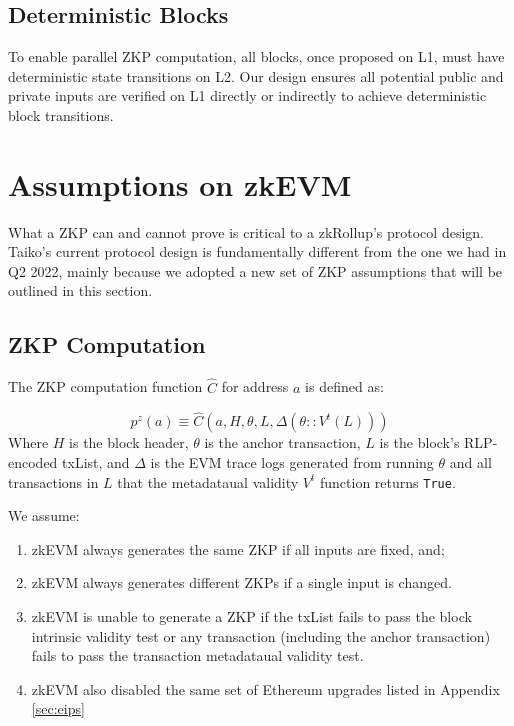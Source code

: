 \documentclass[9pt,oneside]{amsart}
\begin{document}
\begin{multicols}{2}
\subsection{Deterministic Blocks}
To enable parallel ZKP computation, all blocks, once proposed on L1, must have deterministic state transitions on L2. Our design ensures all potential public and private inputs are verified on L1 directly or indirectly to achieve deterministic block transitions.

\section{Assumptions on zkEVM}

What a ZKP can and cannot prove is critical to a zkRollup's protocol design. Taiko's current protocol design is fundamentally different from the one we had in Q2 2022, mainly because we adopted a new set of ZKP assumptions that will be outlined in this section.


\subsection{ZKP Computation} The ZKP computation function $\hat{C}$ for address $a$ is defined as:


\begin{equation}
    p^z(a) \equiv \hat{C}(a, H,\theta, L, \Delta(\theta::V^t(L)) )
\end{equation}
Where $H$ is the block header, $\theta$ is the anchor transaction, $L$ is the block's RLP-encoded txList, and $\Delta$ is the EVM trace logs generated from running $\theta$ and all transactions in $L$ that the metadataual validity $V^t$ function returns \texttt{True}.

We assume:
\begin{enumerate}
\item zkEVM always generates the same ZKP if all inputs are fixed, and;
\item zkEVM always generates different ZKPs if a single input is changed.
\item zkEVM is unable to generate a ZKP if the txList fails to pass the block intrinsic validity test or any transaction (including the anchor transaction) fails to pass the transaction metadataual validity test.
\item zkEVM also disabled the same set of Ethereum upgrades listed in Appendix \ref{sec:eips}
\end{enumerate}



\end{multicols}
\end{document}
